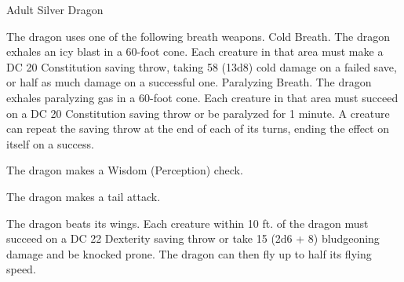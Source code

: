 \begin{monsterbox}{Adult Silver Dragon}
\begin{monsteraction}
The dragon uses one of the following breath weapons.
Cold Breath. The dragon exhales an icy blast in a 60-foot cone. Each creature in that area must make a DC 20 Constitution saving throw, taking 58 (13d8) cold damage on a failed save, or half as much damage on a successful one.
Paralyzing Breath. The dragon exhales paralyzing gas in a 60-foot cone. Each creature in that area must succeed on a DC 20 Constitution saving throw or be paralyzed for 1 minute. A creature can repeat the saving throw at the end of each of its turns, ending the effect on itself on a success.
\end{monsteraction}
\begin{monsteraction}[Detect]
The dragon makes a Wisdom (Perception) check.
\end{monsteraction}
\begin{monsteraction}
The dragon makes a tail attack.
\end{monsteraction}
\begin{monsteraction}
The dragon beats its wings. Each creature within 10 ft. of the dragon must succeed on a DC 22 Dexterity saving throw or take 15 (2d6 + 8) bludgeoning damage and be knocked prone. The dragon can then fly up to half its flying speed.
\end{monsteraction}
\end{monsterbox}